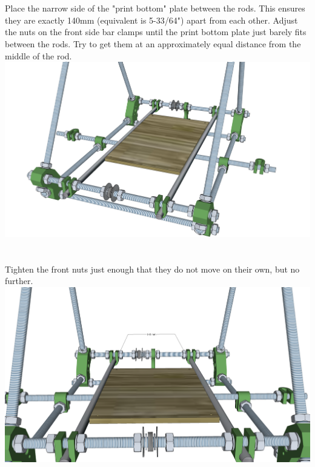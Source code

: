\documentclass[twoside,a4paper,titlepage]{memoir}
\begin{document}
	\section{}
	Place the narrow side of the "print bottom" plate between the rods. This ensures they are exactly
	140mm (equivalent is 5-33/64") apart from each other. Adjust the nuts on the front side bar clamps until
	the print bottom plate just barely fits between the rods. Try to get them at an approximately equal
	distance from the middle of the rod.\\
	\includegraphics[width=1\linewidth]{graphics/ch6_5.png}
	
	\section{}
	Tighten the front nuts just enough that they do not move on their own, but no further.\\
	\includegraphics[width=1\linewidth]{graphics/ch6_6.png}
	
\end{document}
